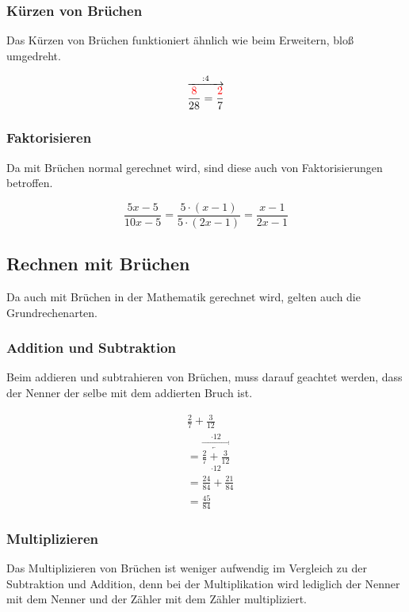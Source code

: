\subsubsection{Kürzen von Brüchen}
Das Kürzen von Brüchen funktioniert ähnlich wie beim Erweitern, bloß umgedreht.

\begin{beispiel}
	\[\overset{:4}{\overrightarrow{\frac{\color{red}8}{28}=\frac{\color{red}2}{7}}}\]
\end{beispiel}

\subsubsection{Faktorisieren} Da mit Brüchen normal gerechnet wird, sind diese auch von Faktorisierungen betroffen. 

\begin{beispiel}
	\[\frac{5x-5}{10x-5}=\frac{5\cdot(x-1)}{5\cdot(2x-1)}=\frac{x-1}{2x-1}\]
\end{beispiel}
\subsection{Rechnen mit Brüchen}
Da auch mit Brüchen in der Mathematik gerechnet wird, gelten auch die Grundrechenarten.
\subsubsection{Addition und Subtraktion} Beim addieren und subtrahieren von Brüchen, muss darauf geachtet werden, dass der Nenner der selbe mit dem addierten Bruch ist. 

\begin{beispiel}
	\begin{align*}
		&\frac{2}{7}+\frac{3}{12}\\
		&={\overset{\cdot 12}{\overrightarrow{\underset{\cdot 12}{\underleftarrow{\frac{2}{7}+\frac{3}{12}}}}}}\\
		&= \frac{24}{84}+\frac{21}{84}\\
		&= \frac{45}{84}
	\end{align*}	
\end{beispiel}
\subsubsection{Multiplizieren} Das Multiplizieren von Brüchen ist weniger aufwendig im Vergleich zu der Subtraktion und Addition, denn bei der Multiplikation wird lediglich der Nenner mit dem Nenner und der Zähler mit dem Zähler multipliziert.

